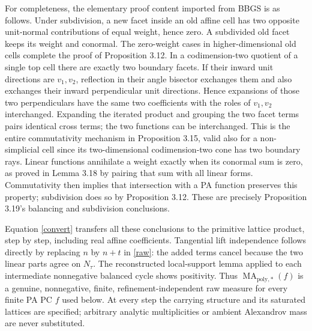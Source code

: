 \documentclass[11pt]{article}
\newcommand{\MAstar}{\operatorname{MA}_{\mathrm{poly},*}}
\begin{document}
For completeness, the elementary proof content imported from BBGS is as
follows. Under subdivision, a new facet inside an old affine cell has
two opposite unit-normal contributions of equal weight, hence zero.
A subdivided old facet keeps its weight and conormal. The zero-weight
cases in higher-dimensional old cells complete the proof of Proposition
3.12. In a codimension-two quotient of a single top cell there are exactly
two boundary facets. If their inward unit directions are \(v_1,v_2\),
reflection in their angle bisector exchanges them and also exchanges their
inward perpendicular unit directions. Hence expansions of those two
perpendiculars have the same two coefficients with the roles of \(v_1,v_2\)
interchanged. Expanding the iterated product and grouping the two
facet terms pairs identical cross terms; the two functions can be
interchanged. This is the entire commutativity mechanism in Proposition
3.15, valid also for a non-simplicial cell since its two-dimensional
codimension-two cone has two boundary rays. Linear functions annihilate
a weight exactly when its conormal sum is zero, as proved in Lemma 3.18
by pairing that sum with all linear forms. Commutativity then implies
that intersection with a PA function preserves this property; subdivision
does so by Proposition 3.12. These are precisely Proposition 3.19's
balancing and subdivision conclusions.

Equation \eqref{convert} transfers all these conclusions to the primitive
lattice product, step by step, including real affine coefficients.
Tangential lift independence follows directly by replacing \(n\) by
\(n+t\) in \eqref{raw}: the added terms cancel because the two linear
parts agree on \(N_\tau\).
The reconstructed local-support lemma applied to each intermediate nonnegative balanced
cycle shows positivity. Thus \(\MAstar(f)\) is a genuine, nonnegative,
finite, refinement-independent raw measure for every finite PA PC \(f\)
used below. At every step the carrying structure and its saturated
lattices are specified; arbitrary analytic multiplicities or ambient
Alexandrov mass are never substituted.
\end{document}
